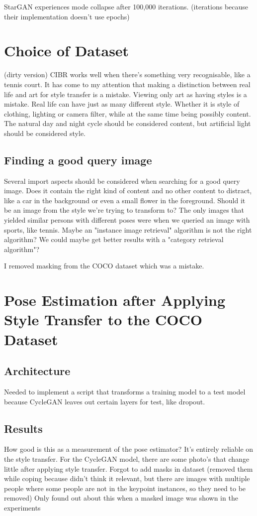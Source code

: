 StarGAN experiences mode collapse after 100,000 iterations. (iterations because their implementation doesn't use epochs)
\section{Choice of Dataset}
(dirty version)
CIBR works well when there's something very recognisable, like a tennis court.
It has come to my attention that making a distinction between real life and art for style transfer is a mistake.
Viewing only art as having styles is a mistake.
Real life can have just as many different style.
Whether it is style of clothing, lighting or camera filter, while at the same time being possibly content.
The natural day and night cycle should be considered content, but artificial light should be considered style.
\subsection{Finding a good query image}
Several import aspects should be considered when searching for a good query image.
Does it contain the right kind of content and no other content to distract, like a car in the background or even a small flower in the foreground.
Should it be an image from the style we're trying to transform to?
The only images that yielded similar persons with different poses were when we queried an image with sports, like tennis.
Maybe an "instance image retrieval" algorithm is not the right algorithm? We could maybe get better results with a "category retrieval algorithm"?

I removed masking from the COCO dataset which was a mistake. 

\section{Pose Estimation after Applying Style Transfer to the COCO Dataset}
\label{sec:baseline_coco_style_transfer}

\subsection{Architecture}
\label{sec:baseline_coco_style_transfer_architecture}
Needed to implement a script that transforms a training model to a test model because CycleGAN leaves out certain layers for test, like dropout.

\subsection{Results}
How good is this as a measurement of the pose estimator?
It's entirely reliable on the style transfer.
For the CycleGAN model, there are some photo's that change little after applying style transfer.
Forgot to add masks in dataset (removed them while coping because didn't think it relevant, but there are images with multiple people where some people are not in the keypoint instances, so they need to be removed)
Only found out about this when a masked image was shown in the experiments
\label{sec:baseline_coco_style_transfer_results}

